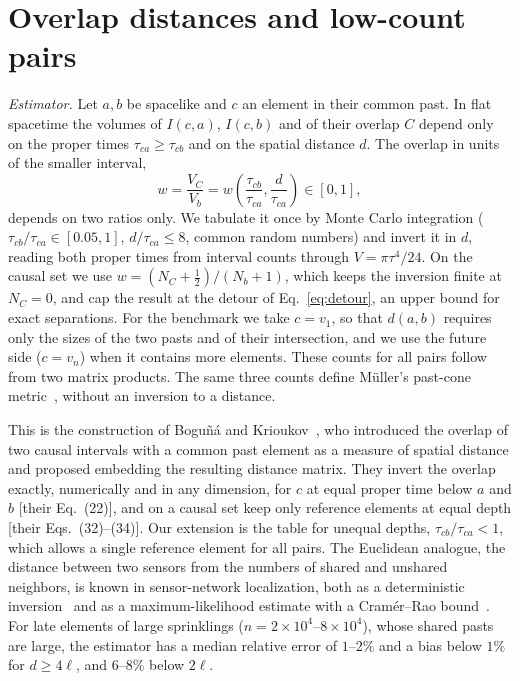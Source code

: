 \documentclass[prd,twocolumn,superscriptaddress,nofootinbib,amsmath,amssymb,floatfix]{revtex4-2}
\begin{document}
\section{Overlap distances and low-count pairs}\label{sec:overlap}
\emph{Estimator.} Let $a,b$ be spacelike and $c$ an element in their common past. In flat spacetime the volumes of $I(c,a)$, $I(c,b)$ and of their overlap $C$ depend only on the proper times $\tau_{ca}\geq\tau_{cb}$ and on the spatial distance $d$. The overlap in units of the smaller interval,
\begin{equation}
w=\frac{V_C}{V_b}=w\!\left(\frac{\tau_{cb}}{\tau_{ca}},\frac{d}{\tau_{ca}}\right)\in[0,1],
\end{equation}
depends on two ratios only. We tabulate it once by Monte Carlo integration ($\tau_{cb}/\tau_{ca}\in[0.05,1]$, $d/\tau_{ca}\le8$, common random numbers) and invert it in $d$, reading both proper times from interval counts through $V=\pi\tau^4/24$. On the causal set we use $w=(N_C+\tfrac12)/(N_b+1)$, which keeps the inversion finite at $N_C=0$, and cap the result at the detour of Eq.~\eqref{eq:detour}, an upper bound for exact separations. For the benchmark we take $c=v_1$, so that $d(a,b)$ requires only the sizes of the two pasts and of their intersection, and we use the future side ($c=v_n$) when it contains more elements. These counts for all pairs follow from two matrix products. The same three counts define M\"uller's past-cone metric~\cite{Muller25}, without an inversion to a distance.

This is the construction of Bogu\~n\'a and Krioukov~\cite{BK24}, who introduced the overlap of two causal intervals with a common past element as a measure of spatial distance and proposed embedding the resulting distance matrix. They invert the overlap exactly, numerically and in any dimension, for $c$ at equal proper time below $a$ and $b$ [their Eq.~(22)], and on a causal set keep only reference elements at equal depth [their Eqs.~(32)--(34)]. Our extension is the table for unequal depths, $\tau_{cb}/\tau_{ca}<1$, which allows a single reference element for all pairs. The Euclidean analogue, the distance between two sensors from the numbers of shared and unshared neighbors, is known in sensor-network localization, both as a deterministic inversion~\cite{Buschmann06} and as a maximum-likelihood estimate with a Cram\'er--Rao bound~\cite{Huang14}. For late elements of large sprinklings ($n=2\times10^4$--$8\times10^4$), whose shared pasts are large, the estimator has a median relative error of $1$--$2\%$ and a bias below $1\%$ for $d\geq4\ell$, and $6$--$8\%$ below $2\ell$.
\end{document}
